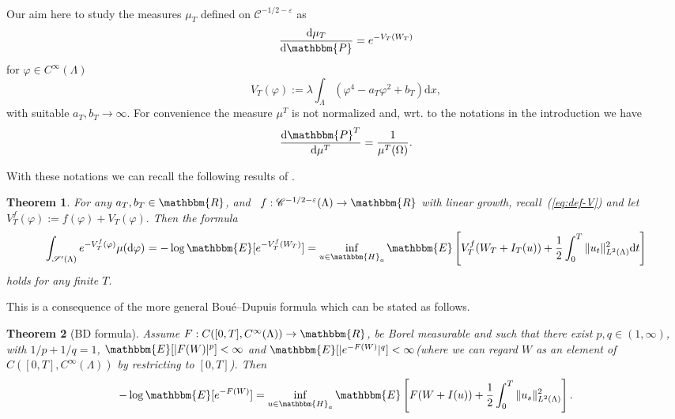 \documentclass[11pt]{article}
\newcommand{\assign}{:=}
\newcommand{\mathd}{\mathrm{d}}
\newtheorem{theorem}{Theorem}
\newcommand{\VV}{\mathscr{C}}
\newcommand{\CS}{\mathscr{S}}
\begin{document}
\

Our aim here to study the measures $\mu_T$ defined on $\VV^{- 1 / 2 -
\varepsilon}$ as
\[ \frac{\mathd \mu_T}{\mathd \mathbbm{P}} = e^{- V_T (W_T)} \]
for $\varphi \in C^{\infty} (\Lambda)$
\begin{equation}
  V_T (\varphi) \assign \lambda \int_{\Lambda} (\varphi^4 - a_T \varphi^2 +
  b_T) \mathd x, \label{eq:def-V}
\end{equation}
with suitable $a_T, b_T \rightarrow \infty$. For convenience the measure
$\mu^T$ is not normalized and, wrt. to the notations in the introduction we
have
\[ \frac{\mathd \mathbbm{P}^T}{\mathd \mu^T} = \frac{1}{\mu^T (\Omega)} . \]


With these notations we can recall the following results of
{\cite{barashkov_gubinelli_variational}}.

\begin{theorem}
  \label{eq:th1}For any $a_T, b_T \in \mathbbm{R}$, and \ $f : \VV^{- 1 / 2 -
  \varepsilon} (\Lambda) \rightarrow \mathbbm{R}$ with linear growth,
  recall~(\ref{eq:def-V}) and let $V^f_T (\varphi) \assign f (\varphi) + V_T
  (\varphi) .$ Then the formula
  \begin{equation}
    \int_{\CS' (\Lambda)} e^{- V^f_T (\varphi)} \mu (\mathd \varphi)^{} = -
    \log \mathbbm{E} [e^{- V^f_T (W_T)}] = \inf_{u \in \mathbbm{H}_a}
    \mathbbm{E} \left[ V^f_T (W_T + I_T (u)) + \frac{1}{2} \int^T_0 \| u_t
    \|^2_{L^2 (\Lambda)} \mathd t \right] \label{eq:contr-prob}
  \end{equation}
  holds for any finite $T$.
\end{theorem}

This is a consequence of the more general Bou{\'e}--Dupuis formula which can
be stated as follows.

\begin{theorem}[BD formula]
  Assume $F : C ([0, T], C^{\infty} (\Lambda)) \rightarrow \mathbbm{R}$, be
  Borel measurable and such that there exist $p, q \in (1, \infty)$, with $1 /
  p + 1 / q = 1$, $\mathbbm{E} [| F (W) |^p] < \infty$ and $\mathbbm{E} [|
  e^{- F (W)} |^q] < \infty$(where we can regard $W$ as an element of $C ([0,
  T], C^{\infty} (\Lambda))$ by restricting to $[0, T]$). Then
  \begin{equation}
    - \log \mathbbm{E} [e^{- F (W)}] = \inf_{u \in \mathbbm{H}_a} \mathbbm{E}
    \left[ F (W + I (u)) + \frac{1}{2} \int^T_0 \| u_s \|_{L^2 (\Lambda)}^2
    \right] . \label{eq:bd}
  \end{equation}
\end{theorem}
\end{document}
